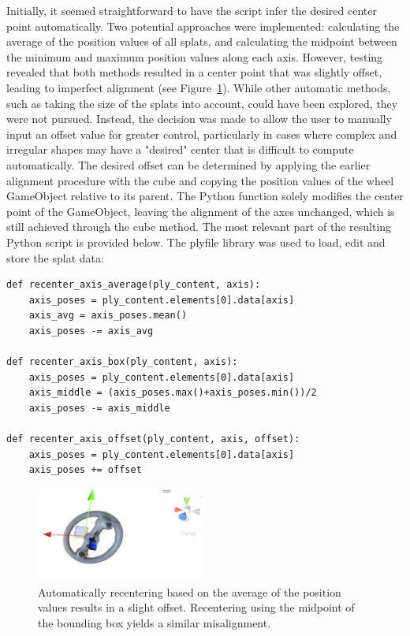 \documentclass[12pt]{article}
\begin{document}
Initially, it seemed straightforward to have the script infer the desired center point automatically. Two potential approaches were implemented: calculating the average of the position values of all splats, and calculating the midpoint between the minimum and maximum position values along each axis. However, testing revealed that both methods resulted in a center point that was slightly offset, leading to imperfect alignment (see Figure~\ref{fig:left_av}). While other automatic methods, such as taking the size of the splats into account, could have been explored, they were not pursued. Instead, the decision was made to allow the user to manually input an offset value for greater control, particularly in cases where complex and irregular shapes may have a "desired" center that is difficult to compute automatically. The desired offset can be determined by applying the earlier alignment procedure with the cube and copying the position values of the wheel GameObject relative to its parent. The Python function solely modifies the center point of the GameObject, leaving the alignment of the axes unchanged, which is still achieved through the cube method. The most relevant part of the resulting Python script is provided below. The plyfile library \cite{Plyfile} was used to load, edit and store the splat data:
\begin{lstlisting}[tabsize=2,caption=Three potential functions for recentering the Gaussian Splat. The desired function is called on each of the three axes., label=code:re_center,breaklines=true,breakatwhitespace=true,basicstyle=\ttfamily\footnotesize]
def recenter_axis_average(ply_content, axis):
	axis_poses = ply_content.elements[0].data[axis]
	axis_avg = axis_poses.mean()
	axis_poses -= axis_avg

def recenter_axis_box(ply_content, axis):
	axis_poses = ply_content.elements[0].data[axis]
	axis_middle = (axis_poses.max()+axis_poses.min())/2
	axis_poses -= axis_middle

def recenter_axis_offset(ply_content, axis, offset):
	axis_poses = ply_content.elements[0].data[axis]
	axis_poses += offset

\end{lstlisting}
\begin{figure}[h!]
	\centering
	\includegraphics[width=0.5\textwidth]{Images/left_wheel_av.png}
	\caption{Automatically recentering based on the average of the position values results in a slight offset. Recentering using the midpoint of the bounding box yields a similar misalignment.}
	\label{fig:left_av}
\end{figure}
\FloatBarrier
\noindent
\end{document}
